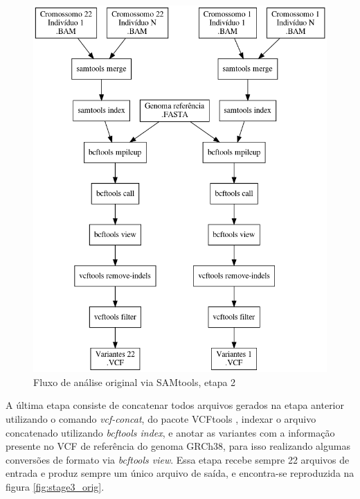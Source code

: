 \documentclass[cic,tc]{iiufrgs}
\begin{document}
{\begin{figure}
  \caption{Fluxo de análise original via SAMtools, etapa 2}
    \begin{center}
      \includegraphics[width=0.85\linewidth]{img/stage2_orig.png}
    \end{center}
    \label{fig:stage2_orig}
\end{figure}

A última etapa consiste de concatenar todos arquivos gerados na etapa anterior
utilizando o comando \textit{vcf-concat}, do pacote
VCFtools \cite{10.1093/bioinformatics/btr330}, indexar o arquivo concatenado
utilizando \textit{bcftools index}, e anotar as variantes com a informação
presente no VCF de referência do genoma GRCh38, para isso realizando algumas
conversões de formato via \textit{bcftools view}. Essa etapa recebe sempre 22
arquivos de entrada e produz sempre um único arquivo de saída, e encontra-se
reproduzida na figura \ref{fig:stage3_orig}.

}
\end{document}
